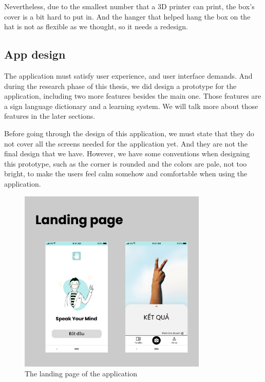 Nevertheless, due to the smallest number that a 3D printer can print, the box's cover is a bit hard to put in. And the hanger that helped hang the box on the hat is not as flexible as we thought, so it needs a redesign.

\subsection{App design}

The application must satisfy user experience, and user interface demands. And during the research phase of this thesis, we did design a prototype for the application, including two more features besides the main one. Those features are a sign language dictionary and a learning system. We will talk more about those features in the later sections.

Before going through the design of this application, we must state that they do not cover all the screens needed for the application yet. And they are not the final design that we have. However, we have some conventions when designing this prototype, such as the corner is rounded and the colors are pale, not too bright, to make the users feel calm somehow and comfortable when using the application.

\begin{figure}[H]
	\centering
	\includegraphics[width=0.8\textwidth]{img/Chap5/Landing_page.png}
	\caption{The landing page of the application}
\end{figure}

